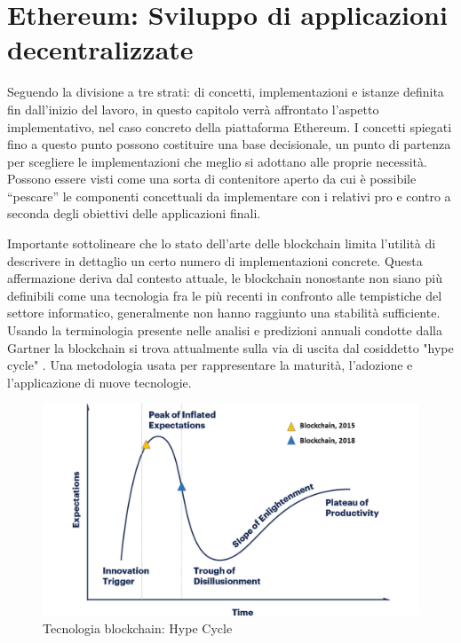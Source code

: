 \chapter{Ethereum: Sviluppo di applicazioni decentralizzate}
\label{ch:ethereum}

Seguendo la divisione a tre strati: di concetti, implementazioni e istanze definita fin dall'inizio del lavoro, in questo capitolo verrà affrontato l'aspetto implementativo, nel caso concreto della piattaforma Ethereum. I concetti spiegati fino a questo punto possono costituire una base decisionale, un punto di partenza per scegliere le implementazioni che meglio si adottano alle proprie necessità. Possono essere visti come una sorta di contenitore aperto da cui è possibile “pescare” le componenti concettuali da implementare con i relativi pro e contro a seconda degli obiettivi delle applicazioni finali. 

Importante sottolineare che lo stato dell'arte delle blockchain limita l’utilità di descrivere in dettaglio un certo numero di implementazioni concrete. Questa affermazione deriva dal contesto attuale, le blockchain nonostante non siano più definibili come una tecnologia fra le più recenti in confronto alle tempistiche del settore informatico, generalmente non hanno raggiunto una stabilità sufficiente. Usando la terminologia presente nelle analisi e predizioni annuali condotte dalla Gartner la blockchain si trova attualmente sulla via di uscita dal cosiddetto "hype cycle" \smallskip {}. Una metodologia usata per rappresentare la maturità, l'adozione e l'applicazione di nuove tecnologie.

\begin{figure}[H]
\centering
\includegraphics[width=1\textwidth]{immagini/blockchainHype.png}
\caption{Tecnologia blockchain: Hype Cycle}
\label{fig:mesh7}
\end{figure}

